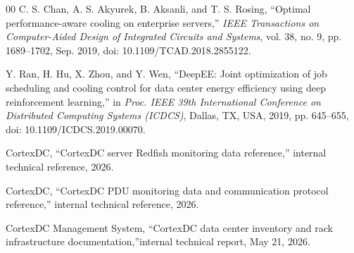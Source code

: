 \documentclass[12pt,a4paper]{article}
\begin{document}
\begin{thebibliography}{00}
C. S. Chan, A. S. Akyurek, B. Aksanli, and T. S. Rosing, ``Optimal performance-aware cooling on enterprise servers,'' \textit{IEEE Transactions on Computer-Aided Design of Integrated Circuits and Systems}, vol. 38, no. 9, pp. 1689--1702, Sep. 2019, doi: 10.1109/TCAD.2018.2855122.

Y. Ran, H. Hu, X. Zhou, and Y. Wen, ``DeepEE: Joint optimization of job scheduling and cooling control for data center energy efficiency using deep reinforcement learning,'' in \textit{Proc. IEEE 39th International Conference on Distributed Computing Systems (ICDCS)}, Dallas, TX, USA, 2019, pp. 645--655, doi: 10.1109/ICDCS.2019.00070.

CortexDC, ``CortexDC server Redfish monitoring data reference,'' internal technical reference, 2026.

CortexDC, ``CortexDC PDU monitoring data and communication protocol reference,'' internal technical reference, 2026.

CortexDC Management System, ``CortexDC data center inventory and rack infrastructure documentation,''internal technical report, May 21, 2026.

\end{thebibliography}
\end{document}
